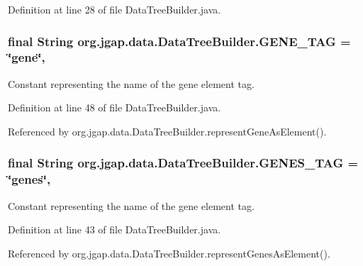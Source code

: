 Definition at line 28 of file Data\-Tree\-Builder.\-java.

\hypertarget{classorg_1_1jgap_1_1data_1_1_data_tree_builder_abbe22f7d2754e88376cfd319b9ec71af}{
\subsubsection[{G\-E\-N\-E\-\_\-\-T\-A\-G}]{\setlength{\rightskip}{0pt plus 5cm}final String org.\-jgap.\-data.\-Data\-Tree\-Builder.\-G\-E\-N\-E\-\_\-\-T\-A\-G = \char`\"{}gene\char`\"{}\hspace{0.3cm}{\ttfamily [static]}, {\ttfamily [private]}}}\label{classorg_1_1jgap_1_1data_1_1_data_tree_builder_abbe22f7d2754e88376cfd319b9ec71af}
Constant representing the name of the gene element tag. 

Definition at line 48 of file Data\-Tree\-Builder.\-java.



Referenced by org.\-jgap.\-data.\-Data\-Tree\-Builder.\-represent\-Gene\-As\-Element().

\hypertarget{classorg_1_1jgap_1_1data_1_1_data_tree_builder_a88f593d267eba709ce8ad8cf073d8a1c}{
\subsubsection[{G\-E\-N\-E\-S\-\_\-\-T\-A\-G}]{\setlength{\rightskip}{0pt plus 5cm}final String org.\-jgap.\-data.\-Data\-Tree\-Builder.\-G\-E\-N\-E\-S\-\_\-\-T\-A\-G = \char`\"{}genes\char`\"{}\hspace{0.3cm}{\ttfamily [static]}, {\ttfamily [private]}}}\label{classorg_1_1jgap_1_1data_1_1_data_tree_builder_a88f593d267eba709ce8ad8cf073d8a1c}
Constant representing the name of the gene element tag. 

Definition at line 43 of file Data\-Tree\-Builder.\-java.



Referenced by org.\-jgap.\-data.\-Data\-Tree\-Builder.\-represent\-Genes\-As\-Element().

